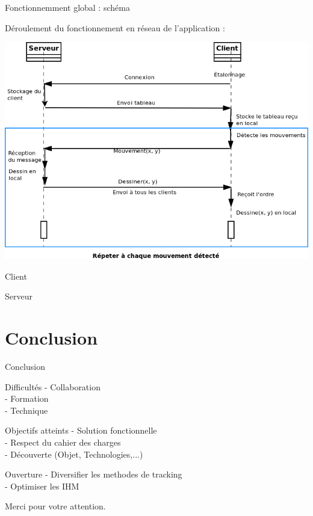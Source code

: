 \documentclass{beamer}
\begin{document}
		\begin{frame}{Fonctionnemment global : schéma}
		
		Déroulement du fonctionnement en réseau de l'application :
			\begin{center}
			\includegraphics[scale=0.40]{../uml/sequence_reseau.png}
			\end{center}
		\end{frame}
		
		\begin{frame}{Client}
		\end{frame}
		\begin{frame}{Serveur}
		\end{frame}

	\section{Conclusion}
		\begin{frame}{Conclusion}
			\begin{alertblock}{Difficultés}
				- Collaboration \\
				- Formation \\
				- Technique 
			\end{alertblock}
			\pause
			\begin{exampleblock}{Objectifs atteints}
				- Solution fonctionnelle \\
				- Respect du cahier des charges \\
				- Découverte (Objet, Technologies,...) 
			\end{exampleblock}
			\pause
			\begin{block}{Ouverture}
				- Diversifier les methodes de tracking\\
				- Optimiser les IHM \\
			\end{block}
		\end{frame}
	
	\begin{frame}
		\begin{center}
			\huge{Merci pour votre attention.} \\
		\end{center}
	\end{frame}
\end{document}

